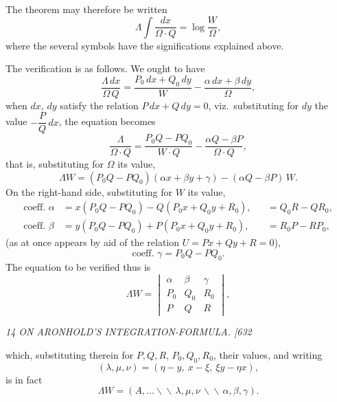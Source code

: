 \documentclass[12pt,a4paper]{article}
\begin{document}
The theorem may therefore be written
\[
\Lambda \int \frac{dx}{\Omega \cdot Q} = \log \frac{W}{\Omega},
\]
where the several symbols have the significations explained above.

The verification is as follows. We ought to have
\[
\frac{\Lambda\, dx}{\Omega\, Q} = \frac{P_0\, dx + Q_0\, dy}{W} - \frac{\alpha\, dx + \beta\, dy}{\Omega},
\]
when $dx$, $dy$ satisfy the relation $P\, dx + Q\, dy = 0$, viz.\ substituting for $dy$ the value $-\dfrac{P}{Q}\, dx$, the equation becomes
\[
\frac{\Lambda}{\Omega \cdot Q} = \frac{P_0 Q - P Q_0}{W \cdot Q} - \frac{\alpha Q - \beta P}{\Omega \cdot Q},
\]
that is, substituting for $\Omega$ its value,
\[
\Lambda W = (P_0 Q - P Q_0)(\alpha x + \beta y + \gamma) - (\alpha Q - \beta P)\, W.
\]
On the right-hand side, substituting for $W$ its value,
\begin{align*}
\text{coeff. } \alpha &= x(P_0 Q - P Q_0) - Q(P_0 x + Q_0 y + R_0), && = Q_0 R - Q R_0, \\
\text{coeff. } \beta &= y(P_0 Q - P Q_0) + P(P_0 x + Q_0 y + R_0), && = R_0 P - R P_0,
\end{align*}
(as at once appears by aid of the relation $U = P x + Q y + R = 0$),
\[
\text{coeff. } \gamma = P_0 Q - P Q_0.
\]
The equation to be verified thus is
\[
\Lambda W = \begin{vmatrix} \alpha & \beta & \gamma \\ P_0 & Q_0 & R_0 \\ P & Q & R \end{vmatrix},
\]

\clearpage
\setcounter{page}{14}

\begin{center}
\textit{14 \hfill ON ARONHOLD'S INTEGRATION-FORMULA. \hfill [632}
\end{center}

\noindent which, substituting therein for $P, Q, R$, $P_0, Q_0, R_0$, their values, and writing
\[
(\lambda, \mu, \nu) = (\eta - y,\ x - \xi,\ \xi y - \eta x),
\]
is in fact
\[
\Lambda W = (A, \ldots\backslash\!\backslash\, \lambda, \mu, \nu\,\backslash\!\backslash\, \alpha, \beta, \gamma).
\]
\end{document}
